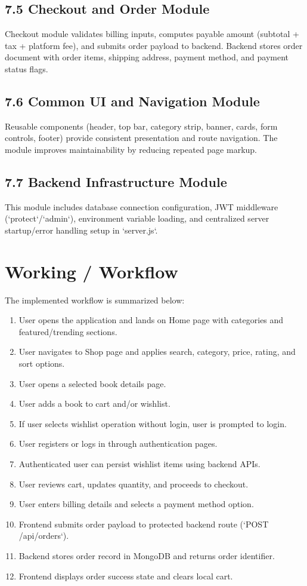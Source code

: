 \documentclass[12pt,a4paper]{report}
\begin{document}
\section*{7.5 Checkout and Order Module}
Checkout module validates billing inputs, computes payable amount (subtotal + tax + platform fee), and submits order payload to backend. Backend stores order document with order items, shipping address, payment method, and payment status flags.

\section*{7.6 Common UI and Navigation Module}
Reusable components (header, top bar, category strip, banner, cards, form controls, footer) provide consistent presentation and route navigation. The module improves maintainability by reducing repeated page markup.

\section*{7.7 Backend Infrastructure Module}
This module includes database connection configuration, JWT middleware (`protect`/`admin`), environment variable loading, and centralized server startup/error handling setup in `server.js`.

\chapter{Working / Workflow}
The implemented workflow is summarized below:
\begin{enumerate}[label=\arabic*.]
    \item User opens the application and lands on Home page with categories and featured/trending sections.
    \item User navigates to Shop page and applies search, category, price, rating, and sort options.
    \item User opens a selected book details page.
    \item User adds a book to cart and/or wishlist.
    \item If user selects wishlist operation without login, user is prompted to login.
    \item User registers or logs in through authentication pages.
    \item Authenticated user can persist wishlist items using backend APIs.
    \item User reviews cart, updates quantity, and proceeds to checkout.
    \item User enters billing details and selects a payment method option.
    \item Frontend submits order payload to protected backend route (`POST /api/orders`).
    \item Backend stores order record in MongoDB and returns order identifier.
    \item Frontend displays order success state and clears local cart.
\end{enumerate}
\end{document}
